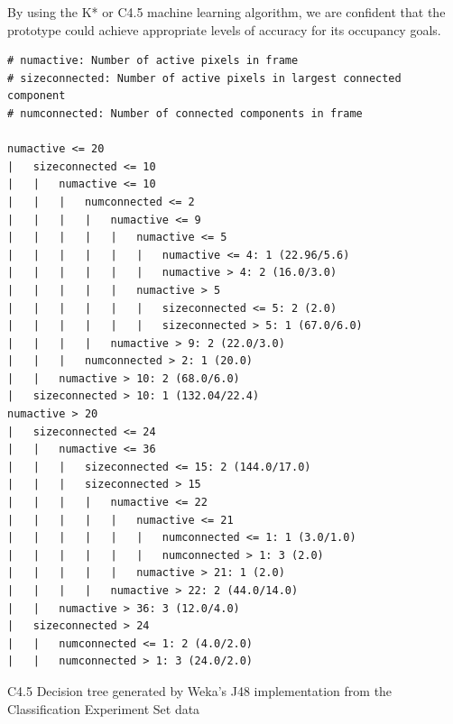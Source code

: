 \documentclass[../thesis/thesis.tex]{subfiles}
\begin{document}
By using the K* or C4.5 machine learning algorithm, we are confident that the prototype could achieve appropriate levels of accuracy for its occupancy goals.

\begin{listing}

\begin{verbatim}
# numactive: Number of active pixels in frame
# sizeconnected: Number of active pixels in largest connected component
# numconnected: Number of connected components in frame

numactive <= 20
|   sizeconnected <= 10
|   |   numactive <= 10
|   |   |   numconnected <= 2
|   |   |   |   numactive <= 9
|   |   |   |   |   numactive <= 5
|   |   |   |   |   |   numactive <= 4: 1 (22.96/5.6)
|   |   |   |   |   |   numactive > 4: 2 (16.0/3.0)
|   |   |   |   |   numactive > 5
|   |   |   |   |   |   sizeconnected <= 5: 2 (2.0)
|   |   |   |   |   |   sizeconnected > 5: 1 (67.0/6.0)
|   |   |   |   numactive > 9: 2 (22.0/3.0)
|   |   |   numconnected > 2: 1 (20.0)
|   |   numactive > 10: 2 (68.0/6.0)
|   sizeconnected > 10: 1 (132.04/22.4)
numactive > 20
|   sizeconnected <= 24
|   |   numactive <= 36
|   |   |   sizeconnected <= 15: 2 (144.0/17.0)
|   |   |   sizeconnected > 15
|   |   |   |   numactive <= 22
|   |   |   |   |   numactive <= 21
|   |   |   |   |   |   numconnected <= 1: 1 (3.0/1.0)
|   |   |   |   |   |   numconnected > 1: 3 (2.0)
|   |   |   |   |   numactive > 21: 1 (2.0)
|   |   |   |   numactive > 22: 2 (44.0/14.0)
|   |   numactive > 36: 3 (12.0/4.0)
|   sizeconnected > 24
|   |   numconnected <= 1: 2 (4.0/2.0)
|   |   numconnected > 1: 3 (24.0/2.0)
\end{verbatim}

\caption{C4.5 Decision tree generated by Weka's J48 implementation from the Classification Experiment Set data}
\label{lst:tree}
\end{listing}
\end{document}
